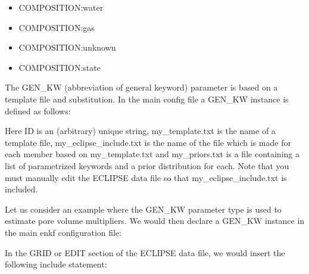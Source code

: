 \documentclass[letterpaper,10pt,english]{sphinxmanual}
\begin{document}
\begin{sphinxShadowBox}
\begin{itemize}
\item {} 
COMPOSITION:water

\item {} 
COMPOSITION:gas

\item {} 
COMPOSITION:unknown

\item {} 
COMPOSITION:state

\end{itemize}
\end{sphinxShadowBox}
\label{\detokenize{keywords/index:gen-kw}}
\begin{sphinxShadowBox}

The GEN\_KW (abbreviation of general keyword) parameter is based on a template
file and substitution. In the main config file a GEN\_KW instance is defined as
follows:

%
\begin{sphinxVerbatim}[commandchars=\\\{\}]
        
\end{sphinxVerbatim}

Here ID is an (arbitrary) unique string, my\_template.txt is the name of a
template file, my\_eclipse\_include.txt is the name of the file which is made
for each member based on my\_template.txt and my\_priors.txt is a file
containing a list of parametrized keywords and a prior distribution for each.
Note that you must manually edit the ECLIPSE data file so that
my\_eclipse\_include.txt is included.

Let us consider an example where the GEN\_KW parameter type is used to estimate
pore volume multipliers. We would then declare a GEN\_KW instance in the main
enkf configuration file:

%
\begin{sphinxVerbatim}[commandchars=\\\{\}]
    
\end{sphinxVerbatim}

In the GRID or EDIT section of the ECLIPSE data file, we would insert the
following include statement:


\end{sphinxShadowBox}
\end{document}

